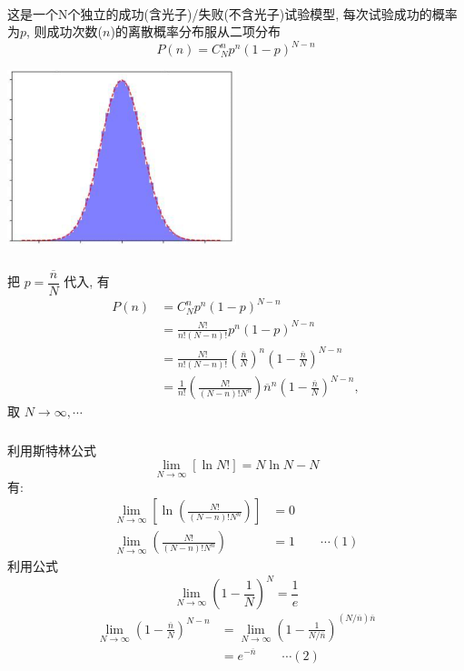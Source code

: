 \begin{frame}
      \frametitle{}
      ~\\
      这是一个N个独立的成功(含光子)/失败(不含光子)试验模型, 每次试验成功的概率为$p$, 则成功次数($n$)的离散概率分布服从二项分布
      \[ P(n) = C^n _N  p^n (1-p)^{N-n} \]
    \begin{center}
             \includegraphics[width=0.5\textwidth]{figs/18.png}
    \end{center}
\end{frame}

\begin{frame}
      \frametitle{}
    把 $p= \dfrac{\overline{n}}{N}$ 代入, 有
      \[\begin{aligned}
          P(n) &= C^n _N  p^n (1-p)^{N-n} \\ 
             &= \frac{N!}{n! (N-n)!} p^n (1-p)^{N-n} \\ 
             &=  \frac{N!}{n! (N-n)!} (\frac{\overline{n}}{N} ) ^n (1-\frac{\overline{n}}{N})^{N-n} \\ 
             &= \frac{1}{n!} \left(\frac{N!} {(N-n)!N^n} \right) \overline{n}^n (1-\frac{\overline{n}}{N})^{N-n}  , 
      \end{aligned}\]
      取 $ N \to \infty , \cdots $
    \end{frame}

\begin{frame}
 \frametitle{}
    利用斯特林公式 
       \[\lim _{N \rightarrow \infty}[\ln N !]=N \ln N -N \]
    有: 
       \[\begin{aligned}
        \lim _{N \rightarrow \infty}\left[ \ln \left(  \frac{N!} {(N-n)!N^n} \right) \right]  &=  0 \\ 
        \lim _{N \rightarrow \infty}\left(  \frac{N!} {(N-n)!N^n} \right) &= 1  \qquad  \cdots (1)
    \end{aligned}\]
    利用公式 
    \[\lim _{N \rightarrow \infty} \left( 1-\frac{1}{N} \right)^N =\frac{1}{e}\]
    \[\begin{aligned}
        \lim _{N \rightarrow \infty} \left(1-\frac{\overline{n}}{N} \right)^{N-n}&=   \lim _{N \rightarrow \infty} \left(1-\frac{1}{N / \overline{n}} \right)^{(N / \overline{n}) \overline{n}}\\ 
         & = e^{-\overline{n}} \qquad  \cdots (2)
    \end{aligned}\]
\end{frame}

